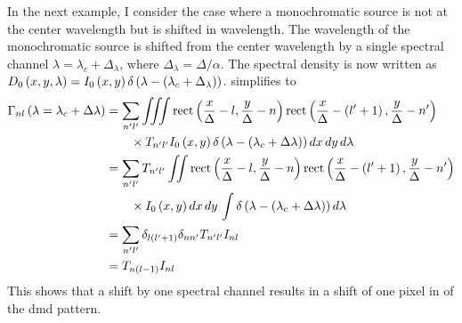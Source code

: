 In the next example, I consider the case where a monochromatic source is not at the center wavelength but is shifted in wavelength. The wavelength of the monochromatic source is shifted from the center wavelength by a single spectral channel $\lambda= \lambda_c + \Delta_{\lambda}$, where $ \Delta_{\lambda} = \Delta / \alpha$. The spectral density is now written as $D_0 \left(x, y, \lambda\right) = I_0 \left(x, y \right) \delta \left( \lambda - \ap{\lambda_c + \Delta_{\lambda} } \right)$.  simplifies to
%
\begin{align} 
	\Gamma_{nl}\left(\lambda = \lambda_c + \Delta \lambda\right) &= \sum_{n'l'} \iiint \mbox{rect} \left( \frac{x}{\Delta} - l, \frac{y}{\Delta} - n \right)  \mbox{rect} \left( \frac{x}{\Delta} - \left(l' + 1 \right), \frac{y}{\Delta} - n' \right) \notag \\
 	&\qquad \times T_{n'l'} I_0 \left( x, y \right) \delta \left( \lambda - \left( \lambda_c + \Delta \lambda \right)\right) dx \, dy \, d\lambda  \notag \\
	&= \sum_{ n^\prime l^\prime} T_{n^\prime l^\prime}  \iint \mbox{rect} \left( \frac{x}{\Delta} -  l, \frac{y}{\Delta} - n \right)  \mbox{rect} \left( \frac{x}{\Delta} - \left(l' + 1 \right), \frac{y}{\Delta} - n' \right) \notag \\
	&\qquad \times I_0 \left( x, y \right) dx \, dy \, \int \delta \left( \lambda - \left( \lambda_c + \Delta \lambda \right)\right) d\lambda  \notag \\
 	&= \sum_{n'l'} \delta_{l \left( l' + 1 \right) } \delta_{nn'} T_{n' l'} I_{nl} \notag \\
 	&= T_{n\left(l - 1 \right)} I_{nl}
 	\label{eq:Mono2}
 \end{align}
%
This shows that a shift by one spectral channel results in a shift of one pixel in of the \gls{dmd} pattern.

